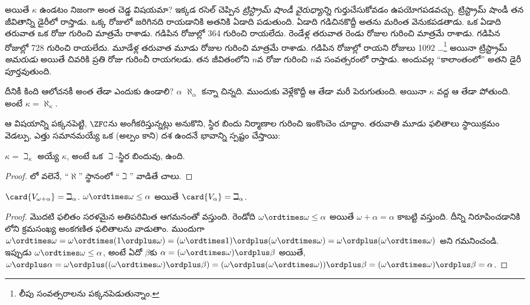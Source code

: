 \documentclass[../../../include/open-logic-section]{subfiles}
\begin{document}
అయితే $\kappa$ ఉండటం నిజంగా అంత చెడ్డ విషయమా?
ఇక్కడ రసెల్ చెప్పిన \emph{ట్రిస్ట్రామ్ షాండీ వైరుధ్యాన్ని}
గుర్తుచేసుకోవడం ఉపయోగపడవచ్చు. ట్రిస్ట్రామ్ షాండీ తన
జీవితాన్ని డైరీలో రాస్తాడు. ఒక్క రోజులో జరిగినది రాయడానికి
అతనికి ఏడాది పడుతుంది. ఏడాది గడిచినకొద్దీ అతను మరింత
వెనుకపడతాడు. ఒక ఏడాది తరువాత ఒక రోజు గురించి మాత్రమే
రాశాడు. గడిపిన రోజుల్లో 364 గురించి రాయలేదు. రెండేళ్ల తరువాత రెండు రోజుల
గురించి మాత్రమే రాశాడు. గడిపిన రోజుల్లో 728 గురించి రాయలేదు. మూడేళ్ల తరువాత
మూడు రోజుల గురించి మాత్రమే రాశాడు. గడిపిన రోజుల్లో రాయని రోజులు
1092 \dots\footnote{లీపు సంవత్సరాలను పక్కనపెడుతున్నాం.}
అయినా ట్రిస్ట్రామ్ \emph{అమరుడు} అయితే చివరికి
ప్రతి రోజు గురించీ రాయగలడు. తన జీవితంలోని $n$వ రోజు
గురించి $n$వ సంవత్సరంలో రాస్తాడు. అందువల్ల ``కాలాంతంలో''
అతని డైరీ పూర్తవుతుంది.

దీనికీ కింది ఆలోచనకీ అంత తేడా ఎందుకు ఉండాలి?
$\alpha$ $\aleph_\alpha$ కన్నా చిన్నది. ముందుకు
వెళ్లేకొద్దీ ఆ తేడా మరీ పెరుగుతుంది. అయినా $\kappa$ వద్ద
ఆ తేడా పోతుంది. అంటే $\kappa = \aleph_\kappa$.

ఆ విషయాన్ని పక్కనపెట్టి, $\ZFC$ను అంగీకరిస్తున్నట్లు అనుకొని, స్థిర బిందు నిర్మాణాల గురించి ఇంకొంచెం చూద్దాం. తరువాతి మూడు ఫలితాలు స్థాయిక్రమం వెడల్పు, ఎత్తు సమానమయ్యే ఒక (అల్పం కాని) దశ ఉందనే భావాన్ని స్పష్టం చేస్తాయి:

\begin{prop}
$\kappa=
\beth_\kappa$ అయ్యే $\kappa$, అంటే ఒక $\beth$-స్థిర బిందువు, ఉంది.
\end{prop}

\begin{proof}
లో వలెనే, ``$\aleph$'' స్థానంలో ``$\beth$'' వాడితే చాలు.
\end{proof}

\begin{prop}
$\card{V_{\omega+\alpha}} = \beth_{\alpha}$. $\omega \ordtimes
\omega \leq \alpha$ అయితే $\card{V_\alpha} = \beth_\alpha$.
\end{prop}

\begin{proof}
మొదటి ఫలితం సరళమైన అతిపరిమిత ఆగమనంతో వస్తుంది. రెండోది $\omega \ordtimes \omega \leq \alpha$ అయితే $\omega + \alpha = \alpha$ కాబట్టి వస్తుంది. దీన్ని నిరూపించడానికి లోని క్రమసంఖ్య అంకగణిత ఫలితాలను వాడుతాం. ముందుగా $\omega \ordtimes \omega = \omega \ordtimes (1 \ordplus \omega) =
(\omega  \ordtimes 1) \ordplus (\omega\ordtimes\omega) = \omega
\ordplus (\omega \ordtimes \omega)$ అని గమనించండి. ఇప్పుడు $\omega \ordtimes \omega
\leq \alpha$, అంటే ఏదో $\beta$కు $\alpha = (\omega\ordtimes\omega) \ordplus \beta$ అయితే, $\omega \ordplus \alpha = \omega \ordplus
((\omega \ordtimes \omega) \ordplus \beta) = (\omega \ordplus (\omega
\ordtimes \omega)) \ordplus \beta = (\omega \ordtimes \omega) \ordplus
\beta = \alpha$.
\end{proof}
\end{document}
